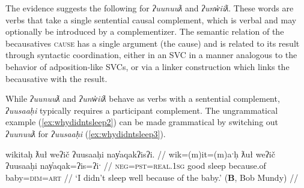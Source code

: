 The evidence suggests the following for \textit{ʔuunuuƛ} and \textit{ʔunw̓iiƛ}. These words are verbs that take a single sentential causal complement, which is verbal and may optionally be introduced by a complementizer. The semantic relation of the becausatives \textsc{cause} has a single argument (the cause) and is related to its result through syntactic coordination, either in an SVC in a manner analogous to the behavior of adposition-like SVCs, or via a linker construction which links the becausative with the result.


While \textit{ʔuunuuƛ} and \textit{ʔunw̓iiƛ} behave as verbs with a sentential complement, \textit{ʔuusaaḥi} typically requires a participant complement. The ungrammatical example (\ref{ex:whydidntsleep2}) can be made grammatical by switching out \textit{ʔuunuuƛ} for \textit{ʔuusaaḥi} (\ref{ex:whydidntsleep3}).

\ex \label{ex:whydidntsleep3}
\begingl
\glpreamble wikitaḥ ƛuł weʔič ʔuusaaḥi nay̓aqakʔisʔi. //
\gla wik=(m)it=(m)aˑḥ ƛuł weʔič ʔuusaaḥi nay̓aqak=ʔis=ʔiˑ //
\glb \textsc{neg}=\textsc{pst}=\textsc{real.1sg} good sleep because.of baby=\textsc{dim}=\textsc{art} //
\glft `I didn't sleep well because of the baby.' (\textbf{B}, Bob Mundy) //
\endgl
\xe

\begin{comment}
\ex \label{ex:uusahi1}
\begingl
\glpreamble ʔuusaaḥimta nay̓aqakʔi. wikitaḥ ƛuł weʔič. //
\gla ʔuusaaḥi=imt=(m)aˑ nay̓aqak=ʔiˑ. wik=(m)it=(m)aˑḥ ƛuł weʔič //
\glb because.of=\textsc{pst}=\textsc{real.3} baby=\textsc{art} \textsc{neg}=\textsc{pst}=\textsc{real.1sg} good sleep //
\glft `It was because of the baby; I didn't sleep well.' (\textbf{B}, Bob Mundy) //
\endgl
\xe

\ex~ \label{ex:uusahi2}
\begingl
\glpreamble *ʔuusaaḥimta ʕiḥak nay̓aqakʔi. wikitaḥ ƛuł weʔič. //
\gla ʔuusaaḥi=imt=(m)aˑ ʕiḥak nay̓aqak=ʔiˑ. wik=(m)it=(m)aˑḥ ƛuł weʔič //
\glb because.of=\textsc{pst}=\textsc{real.3} cry.\textsc{dr} baby \textsc{neg}=\textsc{pst}=\textsc{real.1sg} good sleep //
\glft Intended: `It was because of the crying baby; I didn't sleep well.' (\textbf{B}, Bob Mundy) //
\endgl
\xe
\end{comment}

